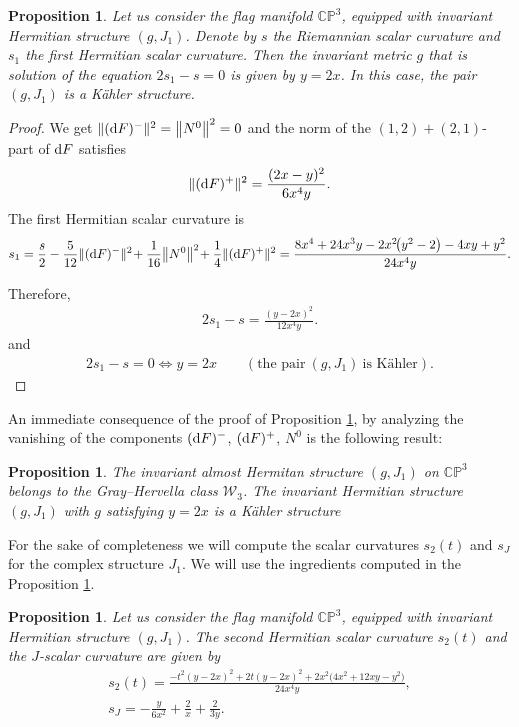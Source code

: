 \documentclass[pdftex]{sigma}%
\numberwithin{equation}{section}
\newtheorem{Proposition}[Theorem]{Proposition}
 { \theoremstyle{definition}
\newtheorem{Definition}[Theorem]{Definition}
\newtheorem{Question}[Theorem]{Question}
\newtheorem*{Notation}{Notation}
\newtheorem{Example}[Theorem]{Example}
\newtheorem{Remark}[Theorem]{Remark} }
\begin{document}
\begin{Proposition}\label{prop-cp3-j1}
Let us consider the flag manifold $\mathbb{CP}^3$, equipped with invariant Hermitian structure $(g, J_{1})$. Denote by $s$ the Riemannian scalar curvature and $s_1$ the first Hermitian scalar curvature. Then the invariant metric $g$ that is solution of the equation $2s_1-s=0$ is given by $y=2x$. In this case, the pair $(g, J_{1})$ is a K\"ahler structure.
\end{Proposition}
\begin{proof}
We get $\|({\rm d}F)^{-}\|^{2}=\big\|N^{0}\big\|^{2}=0$ and the norm of the $(1,2)+(2,1)$-part of ${\rm d}F$ satisfies
\begin{gather*}
\|({\rm d}F)^{+}\|^{2}=\dfrac{(2 x - y)^2}{6 x^4 y}.
\end{gather*}
The first Hermitian scalar curvature is
\begin{align*}
s_{1}=\dfrac{s}{2}-\dfrac{5}{12}\|({\rm d}F)^{-}\|^{2}\!+\dfrac{1}{16}\big\|N^{0}\big\|^{2}\!+\dfrac{1}{4}\|({\rm d}F)^{+}\|^{2}
=\frac{8 x^4+24 x^3 y-2 x^2\! \big(y^2-2\big)-4 x y+y^2}{24 x^4 y}.
\end{align*}

Therefore,
\begin{gather*}
2s_{1}-s=\frac{(y-2 x)^2}{12 x^4 y}.
\end{gather*}
and
\begin{gather*}
2s_{1}-s=0\Leftrightarrow y=2x \qquad (\text{the pair}\ (g, J_1) \ \text{is K\"ahler}).\tag*{\qed}
\end{gather*}
\renewcommand{\qed}{}
\end{proof}


An immediate consequence of the proof of Proposition \ref{prop-cp3-j1}, by analyzing the vanishing of the components $({\rm d}F)^{-}$, $({\rm d}F)^{+}$, $N^0$ is the following result:
\begin{Proposition}
The invariant almost Hermitan structure $(g, J_{1})$ on $\mathbb{CP}^3$ belongs to the Gray--Hervella class $\mathcal{W}_{3}$. The invariant Hermitian structure $(g, J_{1})$ with $g$ satisfying $y=2x$ is a K\"ahler structure
\end{Proposition}

For the sake of completeness we will compute the scalar curvatures $s_2(t)$ and $s_J$ for the complex structure $J_1$. We will use the ingredients computed in the Proposition \ref{prop-cp3-j1}.

\begin{Proposition}
Let us consider the flag manifold $\mathbb{CP}^3$, equipped with invariant Hermitian structure $(g, J_{1})$. The second Hermitian scalar curvature $s_2(t)$ and the $J$-scalar curvature are given by
\begin{gather*}
s_{2}(t)=\frac{-t^2 (y-2 x)^2+2 t (y-2 x)^2+2 x^2 \big(4 x^2+12 x y-y^2\big)}{24 x^4 y},
\\
s_{J}=-\frac{y}{6 x^2}+\frac{2}{x}+\frac{2}{3 y}.
\end{gather*}
\end{Proposition}
\end{document}
